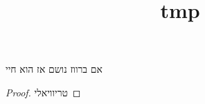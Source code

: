 
\usepackage{thmtools}
\title{tmp}
\setcounter{secnumdepth}{2}



\begin{thm}
	אם ברווז נושם אז הוא חיי
\end{thm}
\begin{proof}
	טריוויאלי
\end{proof}

\listoftheorems[ignoreall,show={thm},title=a]


